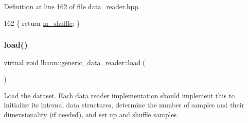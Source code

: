 Definition at line 162 of file data\+\_\+reader.\+hpp.


\begin{DoxyCode}
162 \{ \textcolor{keywordflow}{return} \hyperlink{classlbann_1_1generic__data__reader_a8039ed9c12a5847f0dcf7dd54b8d2f5b}{m\_shuffle}; \}
\end{DoxyCode}
\mbox{\label{classlbann_1_1generic__data__reader_afeb47703d988a230a59859cbfc178215}} 
\subsubsection{\texorpdfstring{load()}{load()}}
{\footnotesize\ttfamily virtual void lbann\+::generic\+\_\+data\+\_\+reader\+::load (\begin{DoxyParamCaption}{ }\end{DoxyParamCaption})\hspace{0.3cm}{\ttfamily [pure virtual]}}

Load the dataset. Each data reader implementation should implement this to initialize its internal data structures, determine the number of samples and their dimensionality (if needed), and set up and shuffle samples. 

